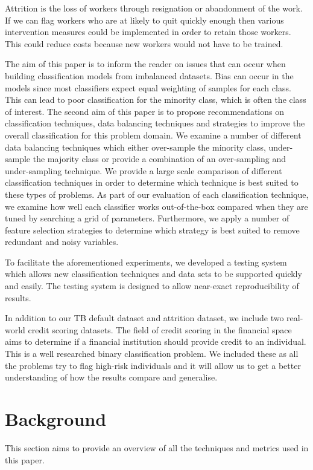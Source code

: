 \documentclass{sig-alternate-05-2015}
\begin{document}
	Attrition is the loss of workers through resignation or abandonment of the work. If we can flag workers who are at likely to quit quickly enough then various intervention measures could be implemented in order to retain those workers. This could reduce costs because new workers would not have to be trained.
	
	The aim of this paper is to inform the reader on issues that can occur when building classification models from imbalanced datasets. Bias can occur in the models since most classifiers expect equal weighting of samples for each class. This can lead to poor classification for the minority class, which is often the class of interest. The second aim of this paper is to propose recommendations on classification techniques, data balancing techniques and strategies to improve the overall classification for this problem domain. We examine a number of different data balancing techniques which either over-sample the minority class, under-sample the majority class or provide a combination of an over-sampling and under-sampling technique. We provide a large scale comparison of different classification techniques in order to determine which technique is best suited to these types of problems. As part of our evaluation of each classification technique, we examine how well each classifier works out-of-the-box compared when they are tuned by searching a grid of parameters. Furthermore, we apply a number of feature selection strategies to determine which strategy is best suited to remove redundant and noisy variables.
	
	To facilitate the aforementioned experiments, we developed a testing system which allows new classification techniques and data sets to be supported quickly and easily. The testing system is designed to allow near-exact reproducibility of results.
	
	In addition to our TB default dataset and attrition dataset, we include two real-world credit scoring datasets. The field of credit scoring in the financial space aims to determine if a financial institution should provide credit to an individual. This is a well researched binary classification problem. We included these as all the problems try to flag high-risk individuals and it will allow us to get a better understanding of how the results compare and generalise.
	
	\section{Background}
	This section aims to provide an overview of all the techniques and metrics used in this paper.
\end{document}
